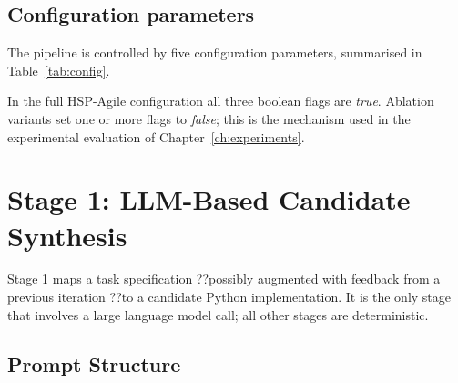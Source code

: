\subsection*{Configuration parameters}

The pipeline is controlled by five configuration parameters, summarised in
Table~\ref{tab:config}.

\begin{table}[H]
  \caption{HSP-Agile pipeline configuration parameters.}
  \label{tab:config}
  \centering
\end{table}

In the full HSP-Agile configuration all three boolean flags are \textit{true}.
Ablation variants set one or more flags to \textit{false}; this is the
mechanism used in the experimental evaluation of
Chapter~\ref{ch:experiments}.

\section{Stage 1: LLM-Based Candidate Synthesis}
\label{sec:method:synthesis}

Stage 1 maps a task specification ??possibly augmented with feedback from a
previous iteration ??to a candidate Python implementation.  It is the only
stage that involves a large language model call; all other stages are
deterministic.

\subsection{Prompt Structure}
\label{subsec:method:prompt}


